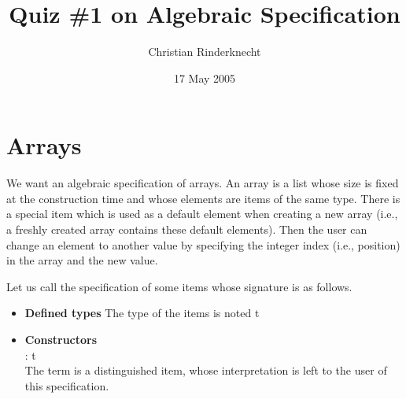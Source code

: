 \documentclass[11pt,a4paper]{article}
\title{Quiz \#1 on Algebraic Specification}
\author{Christian Rinderknecht}
\date{17 May 2005}
\newcommand\type[1]{\textsf{#1}}
\begin{document}
\maketitle

\section{Arrays}

We want an algebraic specification of arrays. An array is a list whose
size is fixed at the construction time and whose elements are items of
the same type. There is a special item which is used as a default
element when creating a new array (i.e., a freshly created array
contains these default elements). Then the user can change an element
to another value by specifying the integer index (i.e., position) in
the array and the new value.

\noindent Let us call  the specification of some items whose
signature is as follows.
\begin{itemize}

   \item \textbf{Defined types}
   The type of the items is noted \type{t}

   \item \textbf{Constructors}\\  : \type{t}\\ The term
      is a distinguished item, whose interpretation is
     left to the user of this specification.

\end{itemize}
\end{document}
